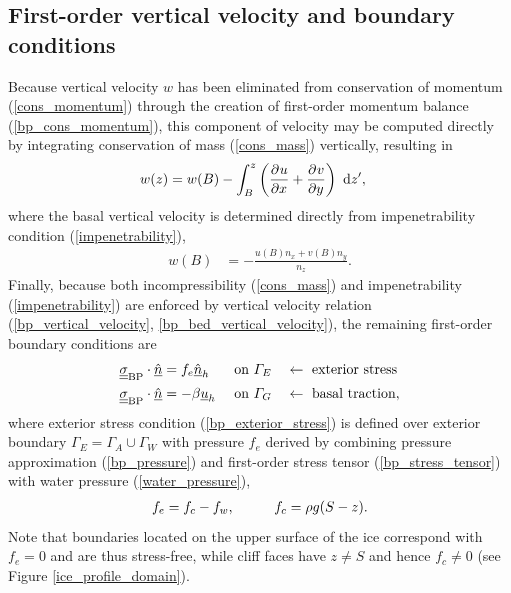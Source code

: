 \subsection{First-order vertical velocity and boundary conditions}

Because vertical velocity $w$ has been eliminated from conservation of momentum (\ref{cons_momentum}) through the creation of first-order momentum balance (\ref{bp_cons_momentum}), this component of velocity may be computed directly by integrating conservation of mass (\ref{cons_mass}) vertically, resulting in
\begin{align}
  \label{bp_vertical_velocity}
  w(z) &= w(B) - \int_B^z \left( \frac{\partial^{} u}{\partial x^{} } + \frac{\partial^{} v}{\partial y^{} } \right) \ \mathrm{d}z',
\end{align}
where the basal vertical velocity is determined directly from impenetrability condition  (\ref{impenetrability}),
\begin{align}
  \label{bp_bed_vertical_velocity}
  w(B) &= - \frac{u(B) n_x + v(B) n_y}{n_z}. 
\end{align}
Finally, because both incompressibility (\ref{cons_mass}) and impenetrability (\ref{impenetrability}) are enforced by vertical velocity relation (\ref{bp_vertical_velocity}, \ref{bp_bed_vertical_velocity}), the remaining first-order boundary conditions are
\begin{align}
  \label{bp_exterior_stress}
  \underline{\underline{\sigma}}_{\text{BP}} \cdot \underline{\hat{n}} &= f_e \underline{\hat{n}}_h &&\text{ on } \varGamma_E &&\leftarrow \text{ exterior stress} \\
  \label{bp_basal_drag}
  \underline{\underline{\sigma}}_{\text{BP}} \cdot \underline{\hat{n}} &= -\beta \underline{u}_h &&\text{ on } \varGamma_G &&\leftarrow \text{ basal traction},
\end{align}
where exterior stress condition (\ref{bp_exterior_stress}) is defined over exterior boundary $\Gamma_E = \Gamma_A \cup \Gamma_W$ with pressure $f_e$ derived by combining pressure approximation (\ref{bp_pressure}) and first-order stress tensor (\ref{bp_stress_tensor}) with water pressure (\ref{water_pressure}), 
\begin{align}
  \label{exterior_pressure}
  f_e = f_c - f_w, \hspace{10mm} f_c = \rho g (S - z).
\end{align}
Note that boundaries located on the upper surface of the ice correspond with $f_e = 0$ and are thus stress-free, while cliff faces have $z \neq S$ and hence $f_c \neq 0$ (see Figure \ref{ice_profile_domain}).

